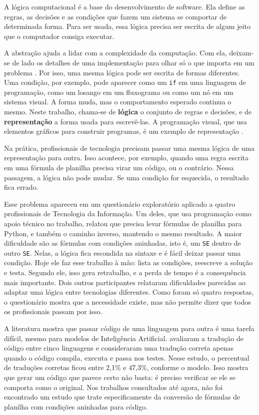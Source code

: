 A lógica computacional é a base do desenvolvimento de software. Ela define as regras, as decisões e as condições que fazem um sistema se comportar de determinada forma. Para ser usada, essa lógica precisa ser escrita de algum jeito que o computador consiga executar.

A abstração ajuda a lidar com a complexidade da computação. Com ela, deixam-se de lado os detalhes de uma implementação para olhar só o que importa em um problema \cite{abelson1996}. Por isso, uma mesma lógica pode ser escrita de formas diferentes. Uma condição, por exemplo, pode aparecer como um \texttt{if} em uma linguagem de programação, como um losango em um fluxograma ou como um nó em um sistema visual. A forma muda, mas o comportamento esperado continua o mesmo. Neste trabalho, chama-se de \textbf{lógica} o conjunto de regras e decisões, e de \textbf{representação} a forma usada para escrevê-las. A programação visual, que usa elementos gráficos para construir programas, é um exemplo de representação \cite{myers1990,noone2018}.

Na prática, profissionais de tecnologia precisam passar uma mesma lógica de uma representação para outra. Isso acontece, por exemplo, quando uma regra escrita em uma fórmula de planilha precisa virar um código, ou o contrário. Nessa passagem, a lógica não pode mudar. Se uma condição for esquecida, o resultado fica errado.

Esse problema apareceu em um questionário exploratório aplicado a quatro profissionais de Tecnologia da Informação. Um deles, que usa programação como apoio técnico no trabalho, relatou que precisa levar fórmulas de planilha para Python, e também o caminho inverso, mantendo o mesmo resultado. A maior dificuldade são as fórmulas com condições aninhadas, isto é, um \texttt{SE} dentro de outro \texttt{SE}. Nelas, a lógica fica escondida na sintaxe e é fácil deixar passar uma condição. Hoje ele faz esse trabalho à mão: lista as condições, reescreve a solução e testa. Segundo ele, isso gera retrabalho, e a perda de tempo é a consequência mais importante. Dois outros participantes relataram dificuldades parecidas ao adaptar uma lógica entre tecnologias diferentes. Como foram só quatro respostas, o questionário mostra que a necessidade existe, mas não permite dizer que todos os profissionais passam por isso.

A literatura mostra que passar código de uma linguagem para outra é uma tarefa difícil, mesmo para modelos de Inteligência Artificial.  avaliaram a tradução de código entre cinco linguagens e consideraram uma tradução correta apenas quando o código compila, executa e passa nos testes. Nesse estudo, o percentual de traduções corretas ficou entre 2,1\% e 47,3\%, conforme o modelo. Isso mostra que gerar um código que parece certo não basta: é preciso verificar se ele se comporta como o original. Nos trabalhos consultados até agora, não foi encontrado um estudo que trate especificamente da conversão de fórmulas de planilha com condições aninhadas para código.

